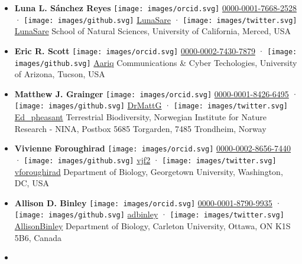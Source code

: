 \begin{itemize}
\item
  \textbf{Luna L. Sánchez Reyes}
  \texttt{[image: images/orcid.svg]}
  \href{https://orcid.org/0000-0001-7668-2528}{0000-0001-7668-2528}
  · \texttt{[image: images/github.svg]}
  \href{https://github.com/LunaSare}{LunaSare}
  · \texttt{[image: images/twitter.svg]}
  \href{https://twitter.com/LunaSare}{LunaSare}
  School of Natural Sciences, University of California, Merced, USA
\item
  \textbf{Eric R. Scott}
  \texttt{[image: images/orcid.svg]}
  \href{https://orcid.org/0000-0002-7430-7879}{0000-0002-7430-7879}
  · \texttt{[image: images/github.svg]}
  \href{https://github.com/Aariq}{Aariq}
  Communications \& Cyber Techologies, University of Arizona, Tucson, USA
\item
  \textbf{Matthew J. Grainger}
  \texttt{[image: images/orcid.svg]}
  \href{https://orcid.org/0000-0001-8426-6495}{0000-0001-8426-6495}
  · \texttt{[image: images/github.svg]}
  \href{https://github.com/DrMattG}{DrMattG}
  · \texttt{[image: images/twitter.svg]}
  \href{https://twitter.com/Ed_pheasant}{Ed\_pheasant}
  Terrestrial Biodiversity, Norwegian Institute for Nature Research - NINA, Postbox 5685 Torgarden, 7485 Trondheim, Norway
\item
  \textbf{Vivienne Foroughirad}
  \texttt{[image: images/orcid.svg]}
  \href{https://orcid.org/0000-0002-8656-7440}{0000-0002-8656-7440}
  · \texttt{[image: images/github.svg]}
  \href{https://github.com/vjf2}{vjf2}
  · \texttt{[image: images/twitter.svg]}
  \href{https://twitter.com/vforoughirad}{vforoughirad}
  Department of Biology, Georgetown University, Washington, DC, USA
\item
  \textbf{Allison D. Binley}
  \texttt{[image: images/orcid.svg]}
  \href{https://orcid.org/0000-0001-8790-9935}{0000-0001-8790-9935}
  · \texttt{[image: images/github.svg]}
  \href{https://github.com/adbinley}{adbinley}
  · \texttt{[image: images/twitter.svg]}
  \href{https://twitter.com/AllisonBinley}{AllisonBinley}
  Department of Biology, Carleton University, Ottawa, ON K1S 5B6, Canada
\item

\end{itemize}
